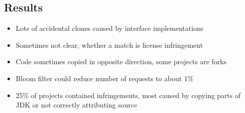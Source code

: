 \subsection{Results}
\begin{frame}{\insertsubsection}
	\begin{itemize}
		\item Lots of accidental clones caused by interface implementations
		\item Sometimes not clear, whether a match is license infringement
		\item Code sometimes copied in opposite direction, some projects are forks
	\end{itemize}

	\begin{itemize}
		\item Bloom filter could reduce number of requests to about 1\%
		\item 25\% of projects contained infringements, most caused by copying parts of JDK or not correctly attributing source
	\end{itemize}
\end{frame}